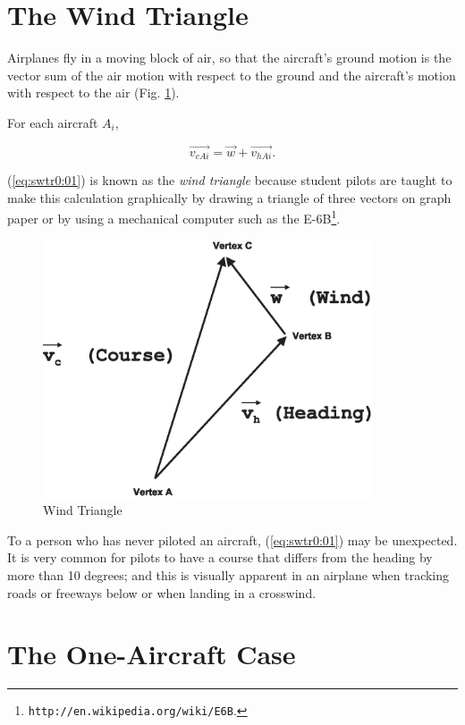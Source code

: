 \documentclass[letterpaper,10pt,titlepage]{article}
\begin{document}
\section{The Wind Triangle}
\label{swtr0}

Airplanes fly in a moving block of air, so that the aircraft's ground motion is the
vector sum of the air motion with respect to the ground and the aircraft's
motion with respect to the air (Fig. \ref{fig:swtr0:00}).

For each aircraft $A_i$,

\begin{equation}
\label{eq:swtr0:01}
\vec{v_{cAi}} = \vec{w} + \vec{v_{hAi}} .
\end{equation}

(\ref{eq:swtr0:01}) is known as the \emph{wind triangle} because student pilots
are taught to make this calculation graphically by drawing a triangle of 
three vectors on graph paper or by using a mechanical computer such as the
E-6B\footnote{\texttt{http://en.wikipedia.org/wiki/E6B}.}.

\begin{figure}
\centering
\includegraphics[height=3.0in]{wtri01.eps}
\caption{Wind Triangle}
\label{fig:swtr0:00}
\end{figure}

To a person who has never piloted an aircraft, (\ref{eq:swtr0:01})
may be unexpected.  It is very common for pilots to have a course that
differs from the heading by more than 10 degrees; and this is
visually apparent in an airplane when tracking roads or freeways below or when
landing in a crosswind.



\section{The One-Aircraft Case}
\label{ssac0}
\end{document}
